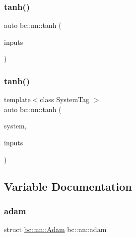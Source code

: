 \mbox{\label{namespacebc_1_1nn_a0f16fef3ad5fcb1481ba386da77a8208}} 
\subsubsection{\texorpdfstring{tanh()}{tanh()}\hspace{0.1cm}{\footnotesize\ttfamily [4/5]}}
{\footnotesize\ttfamily auto bc\+::nn\+::tanh (\begin{DoxyParamCaption}\item[{\hyperlink{namespacebc_aaf8e3fbf99b04b1b57c4f80c6f55d3c5}{bc\+::size\+\_\+t}}]{inputs }\end{DoxyParamCaption})}

\mbox{\label{namespacebc_1_1nn_a1ef53f76e9c68aa315b86accaf67cf67}} 
\subsubsection{\texorpdfstring{tanh()}{tanh()}\hspace{0.1cm}{\footnotesize\ttfamily [5/5]}}
{\footnotesize\ttfamily template$<$class System\+Tag $>$ \\
auto bc\+::nn\+::tanh (\begin{DoxyParamCaption}\item[{System\+Tag}]{system,  }\item[{\hyperlink{namespacebc_aaf8e3fbf99b04b1b57c4f80c6f55d3c5}{bc\+::size\+\_\+t}}]{inputs }\end{DoxyParamCaption})}



\subsection{Variable Documentation}
\mbox{\label{namespacebc_1_1nn_a8c31de21c1ca1a76f7888b8eecce7774}} 
\subsubsection{\texorpdfstring{adam}{adam}}
{\footnotesize\ttfamily struct \hyperlink{structbc_1_1nn_1_1Adam}{bc\+::nn\+::\+Adam}  bc\+::nn\+::adam}


